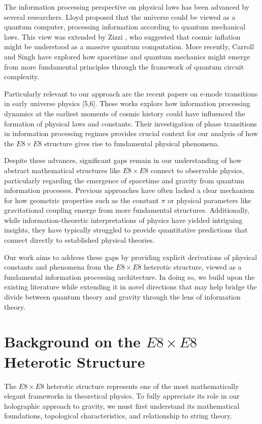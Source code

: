 \documentclass[11pt,english,twoside]{article}
\begin{document}
The information processing perspective on physical laws has been advanced by several researchers. Lloyd \cite{Lloyd1996} proposed that the universe could be viewed as a quantum computer, processing information according to quantum mechanical laws. This view was extended by Zizzi \cite{Zizzi2000}, who suggested that cosmic inflation might be understood as a massive quantum computation. More recently, Carroll and Singh \cite{Carroll2019} have explored how spacetime and quantum mechanics might emerge from more fundamental principles through the framework of quantum circuit complexity.

Particularly relevant to our approach are the recent papers on e-mode transitions in early universe physics [5,6]. These works explore how information processing dynamics at the earliest moments of cosmic history could have influenced the formation of physical laws and constants. Their investigation of phase transitions in information processing regimes provides crucial context for our analysis of how the $E8\times E8$ structure gives rise to fundamental physical phenomena.

Despite these advances, significant gaps remain in our understanding of how abstract mathematical structures like $E8\times E8$ connect to observable physics, particularly regarding the emergence of spacetime and gravity from quantum information processes. Previous approaches have often lacked a clear mechanism for how geometric properties such as the constant $\pi$ or physical parameters like gravitational coupling emerge from more fundamental structures. Additionally, while information-theoretic interpretations of physics have yielded intriguing insights, they have typically struggled to provide quantitative predictions that connect directly to established physical theories.

Our work aims to address these gaps by providing explicit derivations of physical constants and phenomena from the $E8\times E8$ heterotic structure, viewed as a fundamental information processing architecture. In doing so, we build upon the existing literature while extending it in novel directions that may help bridge the divide between quantum theory and gravity through the lens of information theory.

\section{Background on the $E8\times E8$ Heterotic Structure}

The $E8\times E8$ heterotic structure represents one of the most mathematically elegant frameworks in theoretical physics. To fully appreciate its role in our holographic approach to gravity, we must first understand its mathematical foundations, topological characteristics, and relationship to string theory.
\end{document}
